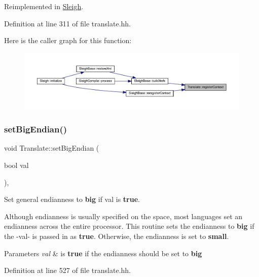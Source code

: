 Reimplemented in \mbox{\hyperlink{class_sleigh_a7df1e3c0c4e2fa3090b6e38f53498aa1}{Sleigh}}.



Definition at line 311 of file translate.\+hh.

Here is the caller graph for this function\+:
\nopagebreak
\begin{figure}[H]
\begin{center}
\leavevmode
\includegraphics[width=350pt]{class_translate_ab389d99d7a2d0c4bdc03c7c1b2362c25_icgraph}
\end{center}
\end{figure}
\mbox{\label{class_translate_a9a2ad5552b84744edd239c3854c8302a}} 
\subsubsection{\texorpdfstring{setBigEndian()}{setBigEndian()}}
{\footnotesize\ttfamily void Translate\+::set\+Big\+Endian (\begin{DoxyParamCaption}\item[{bool}]{val }\end{DoxyParamCaption})\hspace{0.3cm}{\ttfamily [inline]}, {\ttfamily [protected]}}



Set general endianness to {\bfseries{big}} if val is {\bfseries{true}}. 

Although endianness is usually specified on the space, most languages set an endianness across the entire processor. This routine sets the endianness to {\bfseries{big}} if the -\/val-\/ is passed in as {\bfseries{true}}. Otherwise, the endianness is set to {\bfseries{small}}. 
\begin{DoxyParams}{Parameters}
{\em val} & is {\bfseries{true}} if the endianness should be set to {\bfseries{big}} \\
\hline
\end{DoxyParams}


Definition at line 527 of file translate.\+hh.

